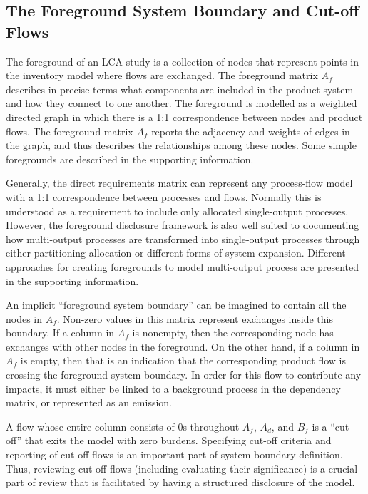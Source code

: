 \subsection{The Foreground System Boundary and Cut-off Flows}

The foreground of an LCA study is a collection of nodes that represent points in the inventory model where flows are exchanged.  The foreground matrix $A_f$ describes in precise terms what components are included in the product system and how they connect to one another.  The foreground is modelled as a weighted directed graph in which there is a 1:1 correspondence between nodes and product flows.  The foreground matrix $A_f$ reports the adjacency and weights of edges in the graph, and thus describes the relationships among these nodes.  Some simple foregrounds are described in the supporting information.

Generally, the direct requirements matrix can represent any process-flow model with a 1:1 correspondence between processes and flows.  Normally this is understood as a requirement to include only allocated single-output processes.  However, the foreground disclosure framework is also well suited to documenting how multi-output processes are transformed into single-output processes through either partitioning allocation or different forms of system expansion.  Different approaches for creating foregrounds to model multi-output process are presented in the supporting information.

An implicit ``foreground system boundary'' can be imagined to contain all the nodes in $A_f$.  Non-zero values in this matrix represent exchanges inside this boundary.  If a column in $A_f$ is nonempty, then the corresponding node has exchanges with other nodes in the foreground.  On the other hand, if a column in $A_f$ is empty, then that is an indication that the corresponding product flow is crossing the foreground system boundary.  In order for this flow to contribute any impacts, it must either be linked to a background process in the dependency matrix, or represented as an emission. 

A flow whose entire column consists of 0s throughout $A_f$, $A_d$, and $B_f$ is a ``cut-off'' that exits the model with zero burdens.  Specifying cut-off criteria and reporting of cut-off flows is an important part of system boundary definition.  Thus, reviewing cut-off flows (including evaluating their significance) is a crucial part of review that is facilitated by having a structured disclosure of the model.

